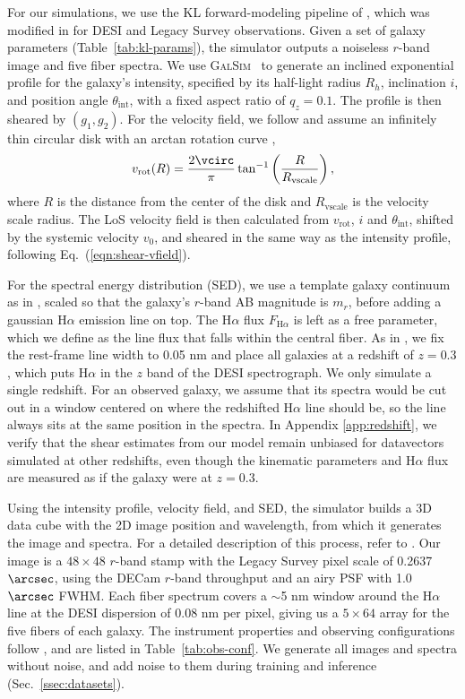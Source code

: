 For our simulations, we use the KL forward-modeling pipeline of \citep{KLInferenceI}, which was modified in \citep{KLDESI} for DESI and Legacy Survey observations. Given a set of galaxy parameters (Table~\ref{tab:kl-params}), the simulator outputs a noiseless $r$-band image and five fiber spectra. We use \textsc{GalSim}~\citep{galsim} to generate an inclined exponential profile for the galaxy's intensity, specified by its half-light radius $R_h$, inclination $i$, and position angle $\theta_\mathrm{int}$, with a fixed aspect ratio of $q_z=0.1$. The profile is then sheared by $(g_1, g_2)$. For the velocity field, we follow \citep{KLDESI} and assume an infinitely thin circular disk with an arctan rotation curve \citep{Courteau97},
\begin{equation}
\label{eqn:vrot}
    v_\mathrm{rot}(R) = \frac{2\vcirc}{\pi}\tan^{-1}\left(\frac{R}{R_\mathrm{vscale}}\right),
\end{equation}
where $R$ is the distance from the center of the disk and $R_\mathrm{vscale}$ is the velocity scale radius. The LoS velocity field is then calculated from $v_\mathrm{rot}$, $i$ and $\theta_\mathrm{int}$, shifted by the systemic velocity $v_0$, and sheared in the same way as the intensity profile, following Eq.~(\ref{eqn:shear-vfield}).

For the spectral energy distribution (SED), we use a template galaxy continuum as in \citep{KLDESI}, scaled so that the galaxy's $r$-band AB magnitude is $m_r$, before adding a gaussian H$\alpha$ emission line on top. The H$\alpha$ flux $F_{\mathrm{H}\alpha}$ is left as a free parameter, which we define as the line flux that falls within the central fiber. As in \citep{KLDESI}, we fix the rest-frame line width to 0.05 nm and place all galaxies at a redshift of $z=0.3$, which puts H$\alpha$ in the $z$ band of the DESI spectrograph. We only simulate a single redshift. For an observed galaxy, we assume that its spectra would be cut out in a window centered on where the redshifted H$\alpha$ line should be, so the line always sits at the same position in the spectra. In Appendix \ref{app:redshift}, we verify that the shear estimates from our model remain unbiased for datavectors simulated at other redshifts, even though the kinematic parameters and H$\alpha$ flux are measured as if the galaxy were at $z=0.3$.

Using the intensity profile, velocity field, and SED, the simulator builds a 3D data cube with the 2D image position and wavelength, from which it generates the image and spectra. For a detailed description of this process, refer to \citep{KLDESI}. Our image is a $48\times48$ $r$-band stamp with the Legacy Survey pixel scale of 0.2637$\arcsec$, using the DECam $r$-band throughput and an airy PSF with 1.0$\arcsec$ FWHM. Each fiber spectrum covers a $\sim$5 nm window around the H$\alpha$ line at the DESI dispersion of 0.08 nm per pixel, giving us a $5\times64$ array for the five fibers of each galaxy. The instrument properties and observing configurations follow \citep{KLDESI}, and are listed in Table~\ref{tab:obs-conf}. We generate all images and spectra without noise, and add noise to them during training and inference (Sec.~\ref{ssec:datasets}).

